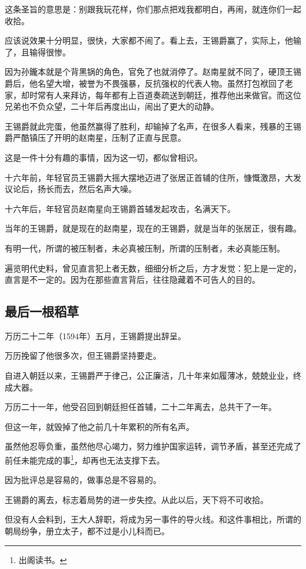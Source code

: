 \begin{multicols}{\theparacolNo}
这条圣旨的意思是：别跟我玩花样，你们那点把戏我都明白，再闹，就连你们一起收拾。

应该说效果十分明显，很快，大家都不闹了。看上去，王锡爵赢了，实际上，他输了，且输得很惨。

因为孙鑨本就是个背黑锅的角色，官免了也就消停了。赵南星就不同了，硬顶王锡爵后，他名望大增，被誉为不畏强暴，反抗强权的代表人物。虽然打包袱回了老家，却时常有人来拜访，每年都有上百道奏疏送到朝廷，推荐他出来做官。而这位兄弟也不负众望，二十年后再度出山，闹出了更大的动静。

王锡爵就此完蛋，他虽然赢得了胜利，却输掉了名声，在很多人看来，残暴的王锡爵严酷镇压了开明的赵南星，压制了正直与民意。

这是一件十分有趣的事情，因为这一切，都似曾相识。

十六年前，年轻官员王锡爵大摇大摆地迈进了张居正首辅的住所，慷慨激昂，大发议论后，扬长而去，然后名声大噪。

十六年后，年轻官员赵南星向王锡爵首辅发起攻击，名满天下。

当年的王锡爵，就是现在的赵南星，现在的王锡爵，就是当年的张居正，很有趣。

有明一代，所谓的被压制者，未必真被压制，所谓的压制者，未必真能压制。

遍览明代史料，曾见直言犯上者无数，细细分析之后，方才发觉：犯上是一定的，直言是不一定的。因为在那些直言背后，往往隐藏着不可告人的目的。

\subsection{最后一根稻草}
万历二十二年（1594年）五月，王锡爵提出辞呈。

万历挽留了他很多次，但王锡爵坚持要走。

自进入朝廷以来，王锡爵严于律己，公正廉洁，几十年来如履薄冰，兢兢业业，终成大器。

万历二十一年，他受召回到朝廷担任首辅，二十二年离去，总共干了一年。

但这一年，就毁掉了他之前几十年累积的所有名声。

虽然他忍辱负重，虽然他尽心竭力，努力维护国家运转，调节矛盾，甚至还完成了前任未能完成的事\footnote{出阁读书。}，却再也无法支撑下去。

因为批评总是容易的，做事总是不容易的。

王锡爵的离去，标志着局势的进一步失控。从此以后，天下将不可收拾。

但没有人会料到，王大人辞职，将成为另一事件的导火线。和这件事相比，所谓的朝局纷争，册立太子，都不过是小儿科而已。
\ifnum{}
	\end{multicols}
\fi
\newpage
